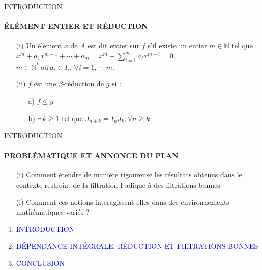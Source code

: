 \documentclass[11pt,a4paper]{beamer}
\begin{document}
\begin{frame}{INTRODUCTION}
	\framesubtitle{ÉLÉMENT ENTIER ET RÉDUCTION}
	\begin{block}{}
		\begin{enumerate}
			\item[(i)] Un élément $x$ de $A$ est dit entier sur $f$ s'il existe un entier $m \in \mathbb{N}$ tel que : $x^m + a_1 x^{m-1} + \cdots + a_m = x^m + \sum_{i=1}^{m} a_i x^{m-i} = 0,$\\$ m \in \mathbb{N^*} \ \text{où} \ a_i \in I_i,\, \forall i=1, \cdots ,m.$
			\item[(ii)] $f$ est une $\beta$-réduction de $g$ si : \\
			\begin{enumerate}
				\item[a)] $f \leq g$
				\item[b)]  $\exists \, k \geq 1$ tel que $J_{n+k} = I_n J_k , \forall n \geq k$.
			\end{enumerate}
		\end{enumerate}
	\end{block}
\end{frame}

\begin{frame}{INTRODUCTION}
	\framesubtitle{PROBLÉMATIQUE ET ANNONCE DU PLAN}
	\begin{block}{}
		\begin{enumerate}
			\item[(i)] Comment étendre de manière rigoureuse les résultats obtenus dans le contexte restreint de la filtration I-adique à des filtrations bonnes 
			\item[(i)] Comment ces notions interagissent-elles dans des environnements mathématiques variés ?
		\end{enumerate}
	\end{block}
\end{frame}

\begin{frame}
\begin{enumerate}
\item<0> \textcolor{blue}{INTRODUCTION}\\
\item<1> \textcolor{blue}{DÉPENDANCE INTÉGRALE, RÉDUCTION ET FILTRATIONS BONNES }\\
\item<0> \textcolor{blue}{CONCLUSION}\\
\end{enumerate}
\end{frame}
\end{document}
